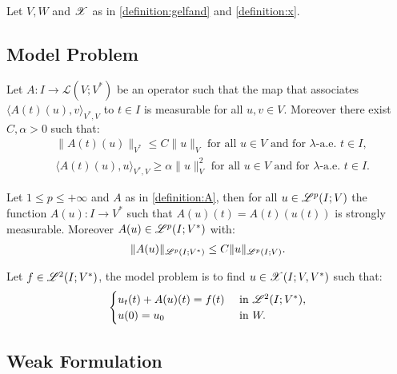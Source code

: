 Let $V, W$ and $\mathscr{X}$ as in \ref{definition:gelfand} and \ref{definition:x}.

\subsection{Model Problem}

\begin{definition}[A] \label{definition:A}
    Let $A \colon I \rightarrow \mathcal{L}(V;V^*)$ be an operator such that the map that associates $\langle A(t)(u), v \rangle_{V^*, V}$ to $t \in I$ is measurable for all $u, v \in V$. Moreover there exist $C, \alpha > 0$ such that:
    \begin{align} \label{equation:a}
        & \lVert A(t)(u) \rVert_{V^*} \leq C \lVert u \rVert_V \text{ for all } u \in V \text{ and for } \lambda \text{-a.e. } t \in I, \\
        & \langle A(t)(u), u \rangle_{V^*, V} \geq \alpha \lVert u \rVert_V^2 \text{ for all } u \in V \text{ and for } \lambda \text{-a.e. } t \in I.
    \end{align}
\end{definition}

\begin{lemma}
    Let $1 \leq p \leq +\infty$ and  $A$ as in \ref{definition:A}, then for all $u \in \mathscr{L}^{p}(I; V)$ the function $A(u) \colon I \rightarrow V^*$ such that $A(u)(t) = A(t)(u(t))$ is strongly measurable. Moreover $A(u) \in \mathscr{L}^{p}(I; V^*)$ with:
    \begin{gather}
        \lVert A(u) \rVert_{\mathscr{L}^{p}(I; V^*)} \leq C \lVert u \rVert_{\mathscr{L}^{p}(I; V)}.
    \end{gather}
\end{lemma}

\begin{definition} \label{definition:model}
    Let $f \in \mathscr{L}^{2}(I; V^*)$, the model problem is to find $u \in \mathscr{X}(I; V, V^*)$ such that:
    \begin{gather}
        \begin{cases}
            u_t(t) + A(u)(t) = f(t) & \text{ in } \mathscr{L}^{2}(I; V^*), \\
            u(0) = u_0 & \text{ in } W.
        \end{cases}
    \end{gather}
\end{definition}

\newpage
\subsection{Weak Formulation}

